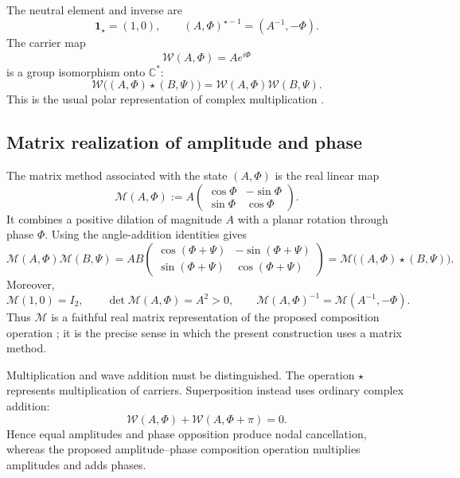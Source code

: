 \documentclass[11pt]{article}
\begin{document}
The neutral element and inverse are
\begin{equation}\label{eq:star-neutral-inverse}
 \mathbf 1_\star=(1,0),\qquad
 (A,\Phi)^{\star-1}=(A^{-1},-\Phi).
\end{equation}
The carrier map
\begin{equation}\label{eq:carrier-map}
 \mathcal W(A,\Phi)=Ae^{i\Phi}
\end{equation}
is a group isomorphism onto $\mathbb C^*$:
\begin{equation}\label{eq:carrier-homomorphism}
 \mathcal W\bigl((A,\Phi)\star(B,\Psi)\bigr)
 =\mathcal W(A,\Phi)\mathcal W(B,\Psi).
\end{equation}
This is the usual polar representation of complex multiplication \cite{Ahlfors}.

\subsection{Matrix realization of amplitude and phase}
The matrix method associated with the state $(A,\Phi)$ is the real linear map
\begin{equation}\label{eq:matrix-realization}
 \boxed{
 \mathcal M(A,\Phi)
 :=A\begin{pmatrix}\cos\Phi&-\sin\Phi\\ \sin\Phi&\cos\Phi\end{pmatrix}.}
\end{equation}
It combines a positive dilation of magnitude $A$ with a planar rotation through phase $\Phi$.
Using the angle-addition identities gives
\begin{equation}\label{eq:matrix-composition}
 \mathcal M(A,\Phi)\mathcal M(B,\Psi)
 =AB\begin{pmatrix}
 \cos(\Phi+\Psi)&-\sin(\Phi+\Psi)\\
 \sin(\Phi+\Psi)&\cos(\Phi+\Psi)
 \end{pmatrix}
 =\mathcal M\bigl((A,\Phi)\star(B,\Psi)\bigr).
\end{equation}
Moreover,
\begin{equation}\label{eq:matrix-identity-inverse}
 \mathcal M(1,0)=I_2,\qquad
 \det\mathcal M(A,\Phi)=A^2>0,\qquad
 \mathcal M(A,\Phi)^{-1}=\mathcal M(A^{-1},-\Phi).
\end{equation}
Thus $\mathcal M$ is a faithful real matrix representation of the proposed composition
operation \cite{HornJohnson}; it is the precise sense in which the present construction uses a
matrix method.

Multiplication and wave addition must be distinguished.  The operation $\star$ represents
multiplication of carriers.  Superposition instead uses ordinary complex addition:
\begin{equation}\label{eq:superposition-cancellation}
 \mathcal W(A,\Phi)+\mathcal W(A,\Phi+\pi)=0.
\end{equation}
Hence equal amplitudes and phase opposition produce nodal cancellation, whereas the
proposed amplitude--phase composition operation multiplies amplitudes and adds phases.
\end{document}
